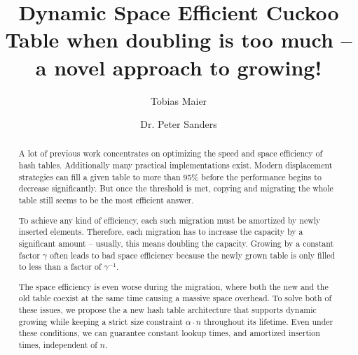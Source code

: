 \documentclass[a4paper,UKenglish]{lipics-v2016}
\title{Dynamic Space Efficient Cuckoo Table when doubling is too much -- a novel approach to growing!}
\author[1]{Tobias Maier}
\author[1]{Dr. Peter Sanders}
\affil[1]{Karlsruhe Institute of Technology, Karlsruhe, Deutschland\\
  \texttt{\{t.maier, sanders\}@kit.edu}}
\begin{document}
\maketitle

\begin{abstract}
A lot of previous work concentrates on optimizing the speed and space
efficiency of hash tables.  Additionally many practical
implementations exist.  Modern displacement strategies can fill a
given table to more than 95\% before the performance begins to decrease
significantly.  But once the threshold is met, copying and migrating
the whole table still seems to be the most efficient answer.

To achieve any kind of efficiency, each such migration must be
amortized by newly inserted elements.  Therefore, each migration has
to increase the capacity by a significant amount -- usually, this
means doubling the capacity.  Growing by a constant factor
$\gamma$ often leads to bad space efficiency because the newly grown table
is only filled to less than a factor of $\gamma^{-1}$.

The space efficiency is even worse during the migration, where both
the new and the old table coexist at the same time causing a massive
space overhead.  To solve both of these issues, we propose the a new
hash table architecture that supports dynamic growing while keeping a
strict size constraint $\alpha \cdot n$ throughout its lifetime.  Even
under these conditions, we can guarantee constant lookup times, and
amortized insertion times, independent of $n$.
 \end{abstract}
\end{document}
